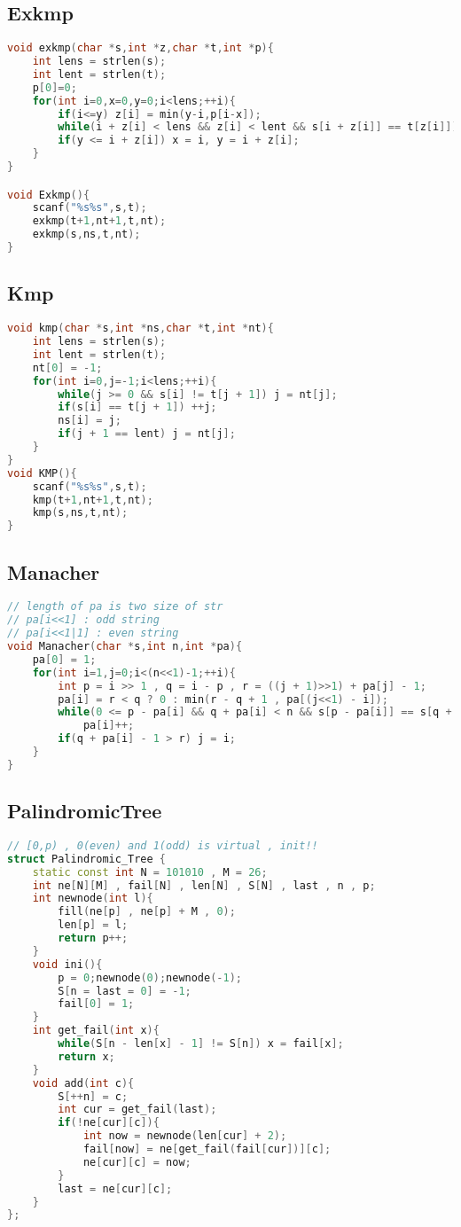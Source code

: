 \subsection{Exkmp}
\begin{lstlisting}[language=C++]
void exkmp(char *s,int *z,char *t,int *p){
    int lens = strlen(s);
    int lent = strlen(t);
    p[0]=0;
    for(int i=0,x=0,y=0;i<lens;++i){
        if(i<=y) z[i] = min(y-i,p[i-x]);
        while(i + z[i] < lens && z[i] < lent && s[i + z[i]] == t[z[i]]) ++z[i];
        if(y <= i + z[i]) x = i, y = i + z[i];
    }
}

void Exkmp(){
    scanf("%s%s",s,t);
    exkmp(t+1,nt+1,t,nt);
    exkmp(s,ns,t,nt);
}
\end{lstlisting}
\subsection{Kmp}
\begin{lstlisting}[language=C++]
void kmp(char *s,int *ns,char *t,int *nt){
    int lens = strlen(s);
    int lent = strlen(t);
    nt[0] = -1;
    for(int i=0,j=-1;i<lens;++i){
        while(j >= 0 && s[i] != t[j + 1]) j = nt[j];
        if(s[i] == t[j + 1]) ++j;
        ns[i] = j;
        if(j + 1 == lent) j = nt[j];
    }
}
void KMP(){
    scanf("%s%s",s,t);
    kmp(t+1,nt+1,t,nt);
    kmp(s,ns,t,nt);
}
\end{lstlisting}
\subsection{Manacher}
\begin{lstlisting}[language=C++]
// length of pa is two size of str
// pa[i<<1] : odd string
// pa[i<<1|1] : even string
void Manacher(char *s,int n,int *pa){
    pa[0] = 1;
    for(int i=1,j=0;i<(n<<1)-1;++i){
        int p = i >> 1 , q = i - p , r = ((j + 1)>>1) + pa[j] - 1;
        pa[i] = r < q ? 0 : min(r - q + 1 , pa[(j<<1) - i]);
        while(0 <= p - pa[i] && q + pa[i] < n && s[p - pa[i]] == s[q + pa[i]])
            pa[i]++;
        if(q + pa[i] - 1 > r) j = i;
    }
}
\end{lstlisting}
\subsection{PalindromicTree}
\begin{lstlisting}[language=C++]
// [0,p) , 0(even) and 1(odd) is virtual , init!!
struct Palindromic_Tree {
    static const int N = 101010 , M = 26;
    int ne[N][M] , fail[N] , len[N] , S[N] , last , n , p;
    int newnode(int l){
        fill(ne[p] , ne[p] + M , 0);
        len[p] = l;
        return p++;
    }
    void ini(){
        p = 0;newnode(0);newnode(-1);
        S[n = last = 0] = -1;
        fail[0] = 1;
    }
    int get_fail(int x){
        while(S[n - len[x] - 1] != S[n]) x = fail[x];
        return x;
    }
    void add(int c){
        S[++n] = c;
        int cur = get_fail(last);
        if(!ne[cur][c]){
            int now = newnode(len[cur] + 2);
            fail[now] = ne[get_fail(fail[cur])][c];
            ne[cur][c] = now;
        }
        last = ne[cur][c];
    }
};
\end{lstlisting}
